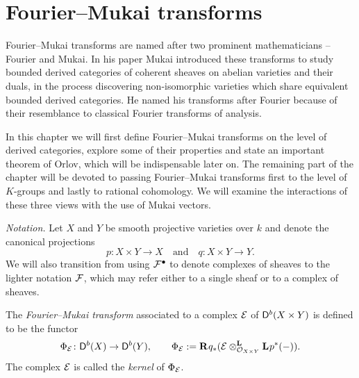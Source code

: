 \section{Fourier--Mukai transforms}
\label{Chapter: Fourier-Mukai transforms}

Fourier--Mukai transforms are named after two prominent mathematicians -- Fourier and Mukai. 
In his paper \cite{Mukai1981} Mukai introduced these transforms to study bounded derived categories of coherent sheaves on abelian varieties and their duals, in the process discovering non-isomorphic varieties which share equivalent bounded derived categories. He named his transforms after Fourier because of their resemblance to classical Fourier transforms of analysis.

In this chapter we will first define Fourier--Mukai transforms on the level of derived categories, explore some of their properties and state an important theorem of Orlov, which will be indispensable later on. The remaining part of the chapter will be devoted to passing Fourier--Mukai transforms first to the level of $K$-groups and lastly to rational cohomology. We will examine the interactions of these three views with the use of Mukai vectors.

\noindent
\textsl{Notation.}
Let $X$ and $Y$ be smooth projective varieties over $k$ and denote the canonical projections 
\[
    p \colon X \times Y \to X \quad \text{and} \quad q \colon X \times Y \to Y.
\]
We will also transition from using $\F^\bullet$ to denote complexes of sheaves to the lighter notation $\F$, which may refer either to a single sheaf or to a complex of sheaves.

\begin{definition}
    The \emph{Fourier--Mukai transform} associated to a complex $\E$ of $\derb{X \times Y}$ is defined to be the functor
    \[
        \fm{\E} \colon \derb{X} \to \derb{Y}, \qquad \fm{\E} := \rderived{}{q_*}(\derivedtensor{\E}{\lderived{}{p^*}(-)}{\struct{X \times Y}}).
    \]
    The complex $\E$ is called the \emph{kernel} of $\fm{\E}$.
\end{definition}

